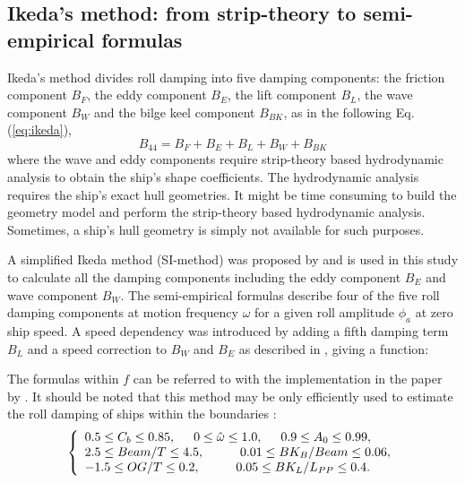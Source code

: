 
\subsection{Ikeda's method: from strip-theory to semi-empirical formulas}
\label{se:semi-empirical methods}
Ikeda's method divides roll damping into five damping components: the friction component $B_F$, the eddy component $B_E$, the lift component $B_L$, the wave component $B_W$ and the bilge keel component $B_{BK}$, as in the following Eq.(\ref{eq:ikeda}), 
\begin{equation} \label{eq:ikeda}
B_{44} = B_F + B_E + B_L + B_W + B_{BK}
\end{equation}
where the wave and eddy components require strip-theory based hydrodynamic analysis to obtain the ship's shape coefficients. The hydrodynamic analysis requires the ship's exact hull geometries. It might be time consuming to build the geometry model and perform the strip-theory based hydrodynamic analysis. Sometimes, a ship's hull geometry is simply not available for such purposes. 

A simplified Ikeda method (SI-method) was proposed by \parencite{kawahara_simple_2011} and is used in this study to calculate all the damping components including the eddy component $B_E$ and wave component $B_W$. The semi-empirical formulas describe four of the five roll damping components at motion frequency $\omega$ for a given roll amplitude $\phi_a$ at zero ship speed. A speed dependency was introduced by adding a fifth damping term $B_L$ and a speed correction to $B_W$ and $B_E$ as described in \parencite{ikeda_velocity_1979}, giving a function: 



The formulas within $f$ can be referred to \parencite{ikeda_velocity_1979, kawahara_simple_2011} with the implementation in the paper by \parencite{alexandersson_martinlarsalbertrolldecay-estimators_2020}.
It should be noted that this method may be only efficiently used to estimate the roll damping of ships within the boundaries \parencite{kawahara_simple_2011}:
\begin{equation}
    \label{eq:SI_limits}
     \left\{
     \begin{array}{ll}
    0.5 \leq C_b \leq 0.85,\hspace{0.5cm} 
    0 \leq \hat{\omega} \leq 1.0,
    \hspace{0.5cm}
    0.9 \leq A_0 \leq 0.99,\\
    2.5\leq Beam/T \leq 4.5, \hspace{1cm}
    0.01 \leq BK_B/Beam \leq 0.06, \\
        -1.5 \leq OG/T \leq 0.2,
     \hspace{1cm}
    0.05 \leq BK_L/L_{PP} \leq 0.4.
    \end{array}
    \right.
\end{equation}

